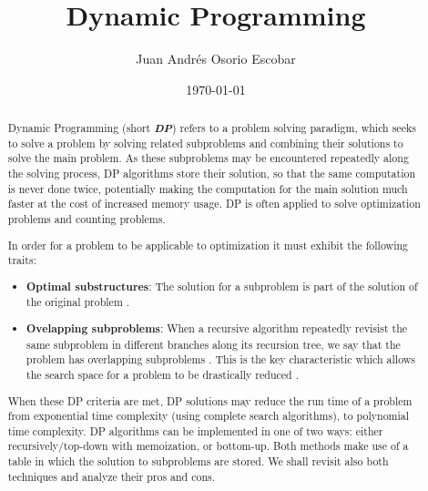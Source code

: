 \documentclass{article}
\begin{document}
\title{Dynamic Programming}
\author{Juan Andrés Osorio Escobar}
\date{\today}
\maketitle

\begin{abstract}
Dynamic Programming (short \textbf{\emph{DP}}) refers to a problem solving paradigm,
  which seeks to solve a problem by solving related subproblems and combining their solutions to solve the main problem.
  As these subproblems may be encountered repeatedly along the solving process, DP algorithms store their solution, so 
  that the same computation is never done twice, potentially making the computation for the main solution much faster at 
  the cost of increased memory usage. DP is often applied to solve optimization problems and counting problems.

  In order for a problem to be applicable to optimization it must exhibit the following traits:

  \begin{itemize}
    \item \textbf{Optimal substructures}: The solution for a subproblem is part of the solution of the original problem \cite{halim2013competitive}.
    \item \textbf{Ovelapping subproblems}: When a recursive algorithm repeatedly revisist the same subproblem in different branches along its recursion tree, we say that the problem has overlapping subproblems \cite{cormen2009introduction}. This is the key characteristic
    which allows the search space for a problem to be drastically reduced \cite{halim2013competitive}.
  \end{itemize}
  
  When these DP criteria are met, DP solutions may reduce the run time of a problem from exponential 
  time complexity (using complete search algorithms), to polynomial time complexity. DP algorithms can be implemented
  in one of two ways: either recursively/top-down with memoization, or bottom-up. Both methods make use of a table in which the solution to subproblems are stored.
  We shall revisit also both techniques and analyze their pros and cons.

  
  


  
\end{abstract}
\end{document}
